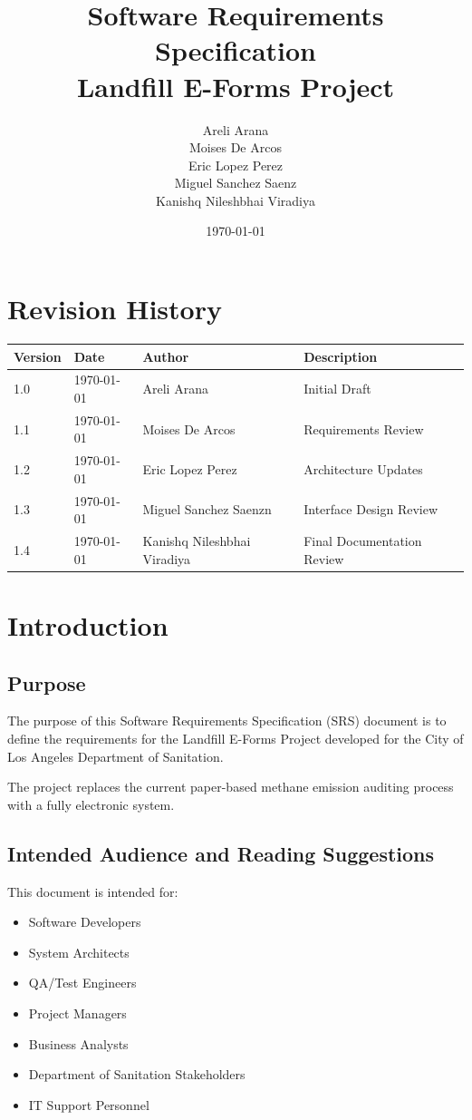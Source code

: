 \documentclass[12pt]{article}
\title{Software Requirements Specification\\
Landfill E-Forms Project}
\author{
Areli Arana \\
Moises De Arcos \\
Eric Lopez Perez \\
Miguel Sanchez Saenz \\
Kanishq Nileshbhai Viradiya
}
\date{\today}
\begin{document}
\maketitle
\newpage
\tableofcontents
\newpage

\section*{Revision History}

\begin{longtable}{|p{2cm}|p{3cm}|p{3cm}|p{5cm}|}
\hline
Version & Date & Author & Description \\ \hline
1.0 & \today & Areli Arana & Initial Draft \\ \hline
1.1 & \today & Moises De Arcos & Requirements Review \\ \hline
1.2 & \today & Eric Lopez Perez & Architecture Updates \\ \hline
1.3 & \today & Miguel Sanchez Saenzn & Interface Design Review \\ \hline
1.4 & \today & Kanishq Nileshbhai Viradiya & Final Documentation Review  \\ \hline
\end{longtable}
\newpage

\section{Introduction}

\subsection{Purpose}

The purpose of this Software Requirements Specification (SRS) document is to define the requirements for the Landfill E-Forms Project developed for the City of Los Angeles Department of Sanitation.

The project replaces the current paper-based methane emission auditing process with a fully electronic system.

\subsection{Intended Audience and Reading Suggestions}

This document is intended for:

\begin{itemize}
\item Software Developers
\item System Architects
\item QA/Test Engineers
\item Project Managers
\item Business Analysts
\item Department of Sanitation Stakeholders
\item IT Support Personnel
\end{itemize}
\end{document}
